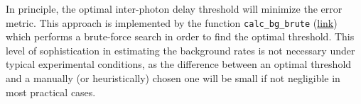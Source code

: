 In principle, the optimal inter-photon delay threshold will minimize
the error metric. This approach is implemented by the function \verb|calc_bg_brute|
(\href{http://fretbursts.readthedocs.org/en/latest/plugins.html#fretbursts.burstlib\_ext.calc\_bg\_brute}{link}) which performs a brute-force search in order to find the optimal threshold.
This level of sophistication in estimating the background rates is not
necessary under typical experimental conditions, as the difference between an optimal threshold
and a manually (or heuristically) chosen one will be small if not negligible in most practical cases.

